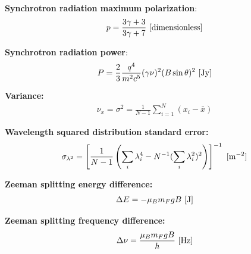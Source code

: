 \documentclass[a4paper,10pt]{article}
\begin{document}
{\noindent}\textbf{Synchrotron radiation maximum polarization}:
\begin{align*}
p = \frac{3\gamma + 3}{3\gamma+7} ~ [{\rm dimensionless}]
\end{align*}

{\noindent}\textbf{Synchrotron radiation power}:
\begin{align*}
P = \frac{2}{3}\dfrac{q^4}{m^2c^5}(\gamma\nu)^2(B\sin\theta)^2 ~ [{\rm Jy}]
\end{align*}

{\noindent}\textbf{Variance:}
\begin{align*}
    \nu_x = \sigma^2= \frac{1}{N-1} \sum_{i=1}^N (x_i-\bar{x})
\end{align*}

{\noindent}\textbf{Wavelength squared distribution standard error:} 
\begin{align*}
\sigma_{\lambda^2} = \left[ \dfrac{1}{N-1} \left( \sum_i\lambda_i^4 - N^{-1}(\sum_i\lambda_i^2)^2 \right) \right]^{-1} ~ [{\rm m^{-2}}]
\end{align*}

{\noindent}\textbf{Zeeman splitting energy difference:}
\begin{align*}
    \Delta E = -\mu_Bm_FgB ~ [{\rm J}]
\end{align*}

{\noindent}\textbf{Zeeman splitting frequency difference:}
\begin{align*}
    \Delta\nu = \frac{\mu_Bm_FgB}{h} ~ [{\rm Hz}]
\end{align*}
\end{document}
